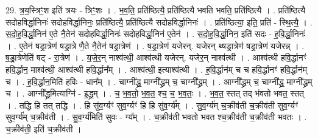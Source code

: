 \documentclass[17pt]{extarticle}
\begin{document}
29. त्र॒य॒स्त्रिꣳ॒॒श इति॑ त्रयः - त्रिꣳ॒॒शः । . भ॒व॒ति॒ प्रति॑ष्ठित्यै॒ प्रति॑ष्ठित्यै भवति भवति॒ प्रति॑ष्ठित्यै । . प्रति॑ष्ठित्यै सदोहविर्द्धा॒निनः॑ सदोहविर्द्धा॒निनः॒ प्रति॑ष्ठित्यै॒ प्रति॑ष्ठित्यै सदोहविर्द्धा॒निनः॑ । . प्रति॑ष्ठित्या॒ इति॒ प्रति॑ - स्थि॒त्यै॒ । . स॒दो॒ह॒वि॒र्द्धा॒निन॑ ए॒ते नै॒तेन॑ सदोहविर्द्धा॒निनः॑ सदोहविर्द्धा॒निन॑ ए॒तेन॑ । . स॒दो॒ह॒वि॒र्द्धा॒निन॒ इति॑ सदः - ह॒वि॒र्द्धा॒निनः॑ । . ए॒तेन॑ षड्रा॒त्रेण॑ षड्रा॒त्रे णै॒ते नै॒तेन॑ षड्रा॒त्रेण॑ । . ष॒ड्रा॒त्रेण॑ यजेरन्. यजेरन् थ्षड्रा॒त्रेण॑ षड्रा॒त्रेण॑ यजेरन्न् । . ष॒ड्रा॒त्रेणेति॑ षट् - रा॒त्रेण॑ । . य॒जे॒र॒न् नाश्व॑त्थी॒ आश्व॑त्थी यजेरन्. यजेर॒न् नाश्व॑त्थी । . आश्व॑त्थी हवि॒र्द्धानꣳ॑ हवि॒र्द्धान॒ माश्व॑त्थी॒ आश्व॑त्थी हवि॒र्द्धान᳚म् । . आश्व॑त्थी॒ इत्याश्व॑त्थी । . ह॒वि॒र्द्धान॑म् च च हवि॒र्द्धानꣳ॑ हवि॒र्द्धान॑म् च । . ह॒वि॒र्द्धान॒मिति॑ हविः - धान᳚म् । . चाग्नी᳚द्ध्र॒ माग्नी᳚द्ध्रम् च॒ चाग्नी᳚द्ध्रम् । . आग्नी᳚द्ध्रम् च॒ चाग्नी᳚द्ध्र॒ माग्नी᳚द्ध्रम् च । . आग्नी᳚द्ध्र॒मित्याग्नि॑ - इ॒द्ध्र॒म् । . च॒ भ॒व॒तो॒ भ॒व॒त॒ श्च॒ च॒ भ॒व॒तः॒ । . भ॒व॒त॒ स्तत् तद् भ॑वतो भवत॒ स्तत् । . तद्धि हि तत् तद्धि । . हि सु॑व॒र्ग्यꣳ॑ सुव॒र्ग्यꣳ॑ हि हि सु॑व॒र्ग्य᳚म् । . सु॒व॒र्ग्य॑म् च॒क्रीव॑ती च॒क्रीव॑ती सुव॒र्ग्यꣳ॑ सुव॒र्ग्य॑म् च॒क्रीव॑ती । . सु॒व॒र्ग्य॑मिति॑ सुवः - ग्य᳚म् । . च॒क्रीव॑ती भवतो भवत श्च॒क्रीव॑ती च॒क्रीव॑ती भवतः । . च॒क्रीव॑ती॒ इति॑ च॒क्रीव॑ती । \newline
\end{document}
